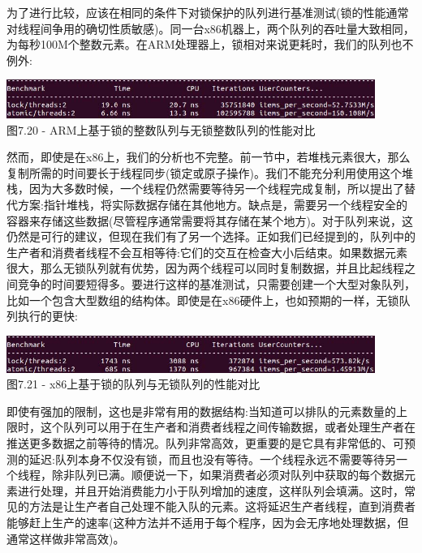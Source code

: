 为了进行比较，应该在相同的条件下对锁保护的队列进行基准测试(锁的性能通常对线程间争用的确切性质敏感)。同一台x86机器上，两个队列的吞吐量大致相同，为每秒100M个整数元素。在ARM处理器上，锁相对来说更耗时，我们的队列也不例外:

\begin{center}
\includegraphics[width=0.9\textwidth]{content/2/chapter7/images/20.jpg}\\
图7.20 - ARM上基于锁的整数队列与无锁整数队列的性能对比
\end{center}

然而，即使是在x86上，我们的分析也不完整。前一节中，若堆栈元素很大，那么复制所需的时间要长于线程同步(锁定或原子操作)。我们不能充分利用使用这个堆栈，因为大多数时候，一个线程仍然需要等待另一个线程完成复制，所以提出了替代方案:指针堆栈，将实际数据存储在其他地方。缺点是，需要另一个线程安全的容器来存储这些数据(尽管程序通常需要将其存储在某个地方)。对于队列来说，这仍然是可行的建议，但现在我们有了另一个选择。正如我们已经提到的，队列中的生产者和消费者线程不会互相等待:它们的交互在检查大小后结束。如果数据元素很大，那么无锁队列就有优势，因为两个线程可以同时复制数据，并且比起线程之间竞争的时间要短得多。要进行这样的基准测试，只需要创建一个大型对象队列，比如一个包含大型数组的结构体。即使是在x86硬件上，也如预期的一样，无锁队列执行的更快:

\begin{center}
\includegraphics[width=0.9\textwidth]{content/2/chapter7/images/21.jpg}\\
图7.21 - x86上基于锁的队列与无锁队列的性能对比
\end{center}

即使有强加的限制，这也是非常有用的数据结构:当知道可以排队的元素数量的上限时，这个队列可以用于在生产者和消费者线程之间传输数据，或者处理生产者在推送更多数据之前等待的情况。队列非常高效，更重要的是它具有非常低的、可预测的延迟:队列本身不仅没有锁，而且也没有等待。一个线程永远不需要等待另一个线程，除非队列已满。顺便说一下，如果消费者必须对队列中获取的每个数据元素进行处理，并且开始消费能力小于队列增加的速度，这样队列会填满。这时，常见的方法是让生产者自己处理不能入队的元素。这将延迟生产者线程，直到消费者能够赶上生产的速率(这种方法并不适用于每个程序，因为会无序地处理数据，但通常这样做非常高效)。

